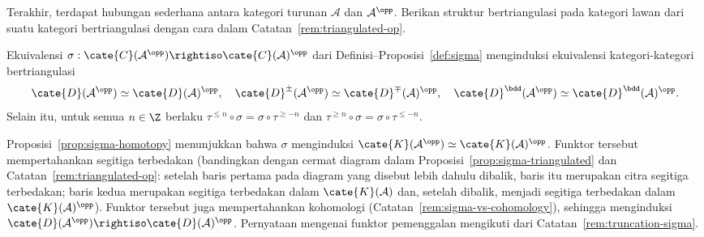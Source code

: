 Terakhir, terdapat hubungan sederhana antara kategori turunan
$\mathcal{A}$ dan $\mathcal{A}^{\opp}$. Berikan struktur bertriangulasi pada
kategori lawan dari suatu kategori bertriangulasi dengan cara dalam
Catatan~\ref{rem:triangulated-op}.

\begin{proposisi}\label{prop:derived-cat-op}
	Ekuivalensi
	$\sigma: \cate{C}(\mathcal{A}^{\opp}) \rightiso \cate{C}(\mathcal{A})^{\opp}$
	dari Definisi--Proposisi~\ref{def:sigma} menginduksi ekuivalensi
	kategori-kategori bertriangulasi
	\[ \cate{D}(\mathcal{A}^{\opp}) \simeq \cate{D}(\mathcal{A})^{\opp}, \quad \cate{D}^\pm(\mathcal{A}^{\opp}) \simeq \cate{D}^\mp(\mathcal{A})^{\opp}, \quad \cate{D}^{\bdd}(\mathcal{A}^{\opp}) \simeq \cate{D}^{\bdd}(\mathcal{A})^{\opp}. \]
	Selain itu, untuk semua $n \in \Z$ berlaku
	$\tau^{\leq n} \circ \sigma = \sigma \circ \tau^{\geq -n}$ dan
	$\tau^{\geq n} \circ \sigma = \sigma \circ \tau^{\leq -n}$.
\end{proposisi}

\begin{bukti}
	Proposisi~\ref{prop:sigma-homotopy} menunjukkan bahwa $\sigma$ menginduksi
	$\cate{K}(\mathcal{A}^{\opp}) \simeq \cate{K}(\mathcal{A})^{\opp}$.
	Funktor tersebut mempertahankan segitiga terbedakan (bandingkan dengan
	cermat diagram dalam Proposisi~\ref{prop:sigma-triangulated} dan
	Catatan~\ref{rem:triangulated-op}: setelah baris pertama pada diagram yang
	disebut lebih dahulu dibalik, baris itu merupakan citra segitiga terbedakan;
	baris kedua merupakan segitiga terbedakan dalam $\cate{K}(\mathcal{A})$ dan,
	setelah dibalik, menjadi segitiga terbedakan dalam
	$\cate{K}(\mathcal{A})^{\opp}$). Funktor tersebut juga mempertahankan
	kohomologi (Catatan~\ref{rem:sigma-vs-cohomology}), sehingga menginduksi
	$\cate{D}(\mathcal{A}^{\opp}) \rightiso \cate{D}(\mathcal{A})^{\opp}$.
	Pernyataan mengenai funktor pemenggalan mengikuti dari
	Catatan~\ref{rem:truncation-sigma}.
\end{bukti}
